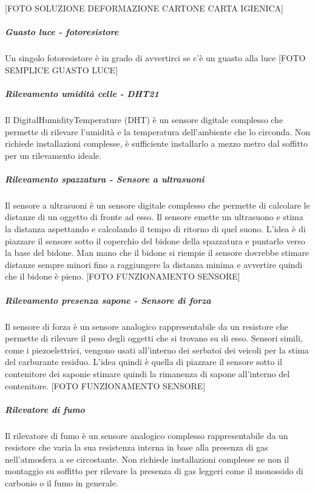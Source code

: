 \documentclass[12pt]{article}
\begin{document}
[FOTO SOLUZIONE DEFORMAZIONE CARTONE CARTA IGIENICA]
\subparagraph{Guasto luce - fotoresistore}
Un singolo fotoresistore è in grado di avvertirci se c'è un guasto alla luce
[FOTO SEMPLICE GUASTO LUCE]
\subparagraph{Rilevamento umidità celle - DHT21}
Il DigitalHumidityTemperature (DHT) è un sensore digitale complesso che permette di rilevare l'umidità e la temperatura dell'ambiente che lo circonda. Non richiede installazioni complesse, è sufficiente installarlo a mezzo metro dal soffitto per un rilevamento ideale.
\subparagraph{Rilevamento spazzatura - Sensore a ultrasuoni}
Il sensore a ultrasuoni è un sensore digitale complesso che permette di calcolare le distanze di un oggetto di fronte ad esso. Il sensore emette un ultrasuono e stima la distanza aspettando e calcolando il tempo di ritorno di quel suono.
L'idea è di piazzare il sensore sotto il coperchio del bidone della spazzatura e puntarlo verso la base del bidone. Man mano che il bidone si riempie il sensore dovrebbe stimare distanze sempre minori fino a raggiungere la distanza minima e avvertire quindi che il bidone è pieno.
[FOTO FUNZIONAMENTO SENSORE]
\subparagraph{Rilevamento presenza sapone - Sensore di forza}
Il sensore di forza è un sensore analogico rappresentabile da un resistore che permette di rilevare il peso degli oggetti che si trovano su di esso. Sensori simili, come i piezoelettrici, vengono usati all'interno dei serbatoi dei veicoli per la stima del carburante residuo. L'idea quindi è quella di piazzare il sensore sotto il contenitore dei saponie stimare quindi la rimanenza di sapone all'interno del contenitore.
[FOTO FUNZIONAMENTO SENSORE]
\subparagraph{Rilevatore di fumo}
Il rilevatore di fumo è un sensore analogico complesso rappresentabile da un resistore che varia la sua resistenza interna in base alla presenza di gas nell'atmosfera a se circostante. Non richiede installazioni complesse se non il montaggio su soffitto per rilevare la presenza di gas leggeri come il monossido di carbonio o il fumo in generale.
\end{document}
